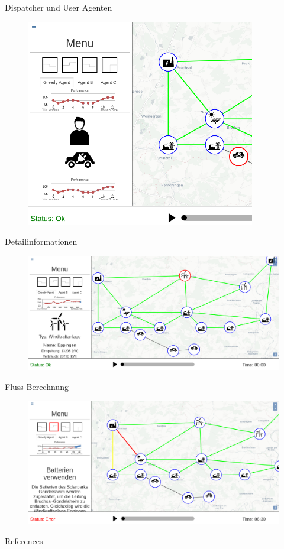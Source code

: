 \documentclass[22pt]{beamer}
\begin{document}
\begin{frame}{Dispatcher und User Agenten}
    \begin{figure}[!h]
      \centering
      \includegraphics[width=100mm]{resources/enduser.png}
      \label{fig:projectplan}
    \end{figure}
  \end{frame}
  \begin{frame}{Detailinformationen}
    \begin{figure}[!h]
      \centering
      \includegraphics[width=115mm]{resources/selected.png}
      \label{fig:projectplan}
    \end{figure}
\end{frame}

\begin{frame}{Fluss Berechnung}
    \begin{figure}[!h]
      \centering
      \includegraphics[width=115mm]{resources/action.png}
      \label{fig:projectplan}
    \end{figure}
\end{frame}



\begin{frame}{References}
  
\end{frame}
\end{document}
